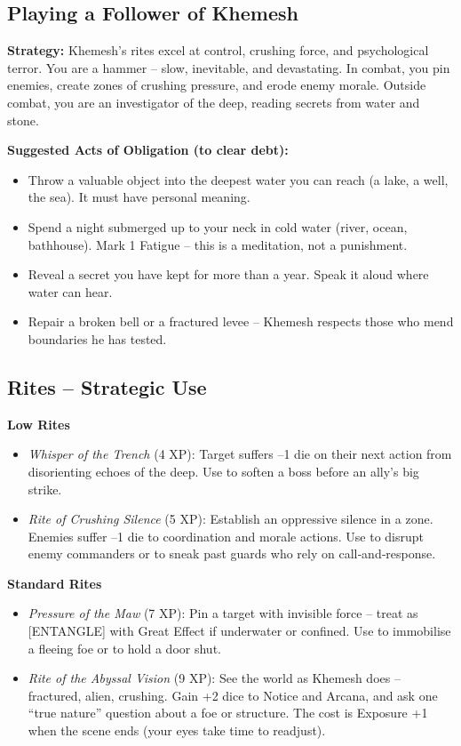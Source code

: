 \documentclass[10pt,a5paper]{book}
\begin{document}
\subsection*{Playing a Follower of Khemesh}

\textbf{Strategy:} Khemesh’s rites excel at control, crushing force, and psychological terror. You are a hammer – slow, inevitable, and devastating. In combat, you pin enemies, create zones of crushing pressure, and erode enemy morale. Outside combat, you are an investigator of the deep, reading secrets from water and stone.

\textbf{Suggested Acts of Obligation (to clear debt):}
\begin{itemize}
    \item Throw a valuable object into the deepest water you can reach (a lake, a well, the sea). It must have personal meaning.
    \item Spend a night submerged up to your neck in cold water (river, ocean, bathhouse). Mark 1 Fatigue – this is a meditation, not a punishment.
    \item Reveal a secret you have kept for more than a year. Speak it aloud where water can hear.
    \item Repair a broken bell or a fractured levee – Khemesh respects those who mend boundaries he has tested.
\end{itemize}

\subsection*{Rites – Strategic Use}

\textbf{Low Rites}
\begin{itemize}
    \item \textit{Whisper of the Trench} (4 XP): Target suffers –1 die on their next action from disorienting echoes of the deep. Use to soften a boss before an ally’s big strike.
    \item \textit{Rite of Crushing Silence} (5 XP): Establish an oppressive silence in a zone. Enemies suffer –1 die to coordination and morale actions. Use to disrupt enemy commanders or to sneak past guards who rely on call‑and‑response.
\end{itemize}

\textbf{Standard Rites}
\begin{itemize}
    \item \textit{Pressure of the Maw} (7 XP): Pin a target with invisible force – treat as [ENTANGLE] with Great Effect if underwater or confined. Use to immobilise a fleeing foe or to hold a door shut.
    \item \textit{Rite of the Abyssal Vision} (9 XP): See the world as Khemesh does – fractured, alien, crushing. Gain +2 dice to Notice and Arcana, and ask one “true nature” question about a foe or structure. The cost is Exposure +1 when the scene ends (your eyes take time to readjust).
\end{itemize}
\end{document}
